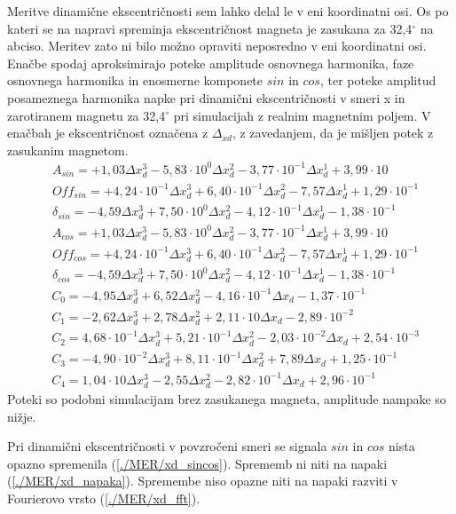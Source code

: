 Meritve dinamične ekscentričnosti sem lahko delal le v eni koordinatni osi. Os po kateri se na napravi spreminja ekscentričnost magneta je zasukana za 32,4$^\circ$ na abciso. Meritev zato ni bilo možno opraviti neposredno v eni koordinatni osi. Enačbe spodaj aproksimirajo poteke amplitude osnovnega harmonika, faze osnovnega harmonika in enosmerne komponete $sin$ in $cos$, ter poteke amplitud posameznega harmonika napke pri dinamični ekscentričnosti v smeri x in zarotiranem magnetu za 32,4$^\circ$ pri simulacijah z realnim magnetnim poljem. V enačbah je ekscentričnost označena z $\Delta_{xd}$, z zavedanjem, da je mišljen potek z zasukanim magnetom. 
\begin{eqnarray}
&A_{sin}=+1,03\Delta x_d^3-5,83\cdot10^{0}\Delta x_d^2-3,77\cdot10^{-1}\Delta x_d^1+3,99\cdot10\\
&Off_{sin}=+4,24\cdot10^{-1}\Delta x_d^3+6,40\cdot10^{-1}\Delta x_d^2-7,57\Delta x_d^1+1,29\cdot10^{-1}\\
&\delta_{sin}=-4,59\Delta x_d^3+7,50\cdot10^{0}\Delta x_d^2-4,12\cdot10^{-1}\Delta x_d^1-1,38\cdot10^{-1}\\
&A_{cos}=+1,03\Delta x_d^3-5,83\cdot10^{0}\Delta x_d^2-3,77\cdot10^{-1}\Delta x_d^1+3,99\cdot10\\
&Off_{cos}=+4,24\cdot10^{-1}\Delta x_d^3+6,40\cdot10^{-1}\Delta x_d^2-7,57\Delta x_d^1+1,29\cdot10^{-1}\\
&\delta_{cos}=-4,59\Delta x_d^3+7,50\cdot10^{0}\Delta x_d^2-4,12\cdot10^{-1}\Delta x_d^1-1,38\cdot10^{-1}
\end{eqnarray}
\begin{eqnarray}
&C_0 =-4,95\Delta x_d^{3}+6,52\Delta x_d^{2}-4,16\cdot 10^{-1}\Delta x_d-1,37\cdot 10^{-1} \\                         
&C_1 =-2,62\Delta x_d^{3}+2,78\Delta x_d^{2}+2,11\cdot 10\Delta x_d-2,89\cdot 10^{-2} \\                              
&C_2 =4,68\cdot 10^{-1}\Delta x_d^{3}+5,21\cdot 10^{-1}\Delta x_d^{2}-2,03\cdot 10^{-2}\Delta x_d+2,54\cdot 10^{-3} \\
&C_3 =-4,90\cdot 10^{-2}\Delta x_d^{3}+8,11\cdot 10^{-1}\Delta x_d^{2}+7,89\Delta x_d+1,25\cdot 10^{-1} \\            
&C_4 =1,04\cdot 10\Delta x_d^{3}-2,55\Delta x_d^{2}-2,82\cdot 10^{-1}\Delta x_d+2,96\cdot 10^{-1}
\end{eqnarray}
Poteki so podobni simulacijam brez zasukanega magneta, amplitude nampake so nižje.

Pri dinamični ekscentričnosti v povzročeni smeri se signala $sin$ in $cos$ nista opazno spremenila (\ref{./MER/xd_sincos}). Sprememb ni niti na napaki (\ref{./MER/xd_napaka}). Spremembe niso opazne niti na  napaki razviti v Fourierovo vrsto (\ref{./MER/xd_fft}).
